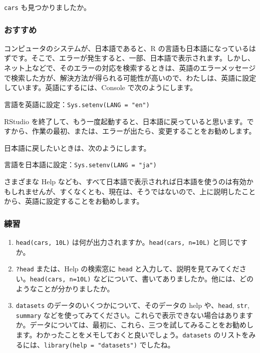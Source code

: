 \documentclass[
]{bxjsbook}
\providecommand{\tightlist}{%
  \setlength{\itemsep}{0pt}\setlength{\parskip}{0pt}}
\theoremstyle{definition}
\theoremstyle{definition}
\theoremstyle{definition}
\theoremstyle{definition}
\theoremstyle{remark}
\begin{document}
\texttt{cars} も見つかりましたか。

\hypertarget{ux304aux3059ux3059ux3081}{%
\subsubsection{おすすめ}\label{ux304aux3059ux3059ux3081}}

コンピュータのシステムが、日本語であると、R の言語も日本語になっているはずです。そこで、エラーが発生すると、一部、日本語で表示されます。しかし、ネット上などで、そのエラーの対応を検索するときは、英語のエラーメッセージで検索した方が、解決方法が得られる可能性が高いので、わたしは、英語に設定しています。英語にするには、Console で次のようにします。

言語を英語に設定：\texttt{Sys.setenv(LANG\ =\ "en")}

RStudio を終了して、もう一度起動すると、日本語に戻っていると思います。ですから、作業の最初、または、エラーが出たら、変更することをお勧めします。

日本語に戻したいときは、次のようにします。

言語を日本語に設定：\texttt{Sys.setenv(LANG\ =\ "ja")}

さまざまな Help なども、すべて日本語で表示されれば日本語を使うのは有効かもしれませんが、すくなくとも、現在は、そうではないので、上に説明したことから、英語に設定することをお勧めします。

\hypertarget{ux7df4ux7fd2}{%
\subsubsection{練習}\label{ux7df4ux7fd2}}

\begin{enumerate}
\def\labelenumi{\arabic{enumi}.}
\tightlist
\item
  \texttt{head(cars,\ 10L)} は何が出力されますか。\texttt{head(cars,\ n=10L)} と同じですか。
\item
  \texttt{?head} または、Help の検索窓に \texttt{head} と入力して、説明を見てみてください。\texttt{head(cars,\ n=10L)} などについて、書いてありましたか。他には、どのようなことが分かりましたか。
\item
  \texttt{datasets} のデータのいくつかについて、そのデータの help や、\texttt{head}, \texttt{str}, \texttt{summary} などを使ってみてください。これらで表示できない場合はありますか。データについては、最初に、これら、三つを試してみることをお勧めします。わかったことをメモしておくと良いでしょう。\texttt{datasets} のリストをみるには、\texttt{library(help\ =\ "datasets")} でしたね。
\end{enumerate}
\end{document}
